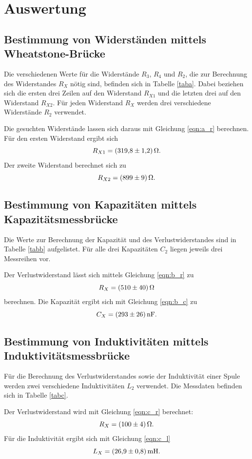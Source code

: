 \section{Auswertung}
\label{sec:Auswertung}

\subsection{Bestimmung von Widerständen mittels Wheatstone-Brücke}
Die verschiedenen Werte für die Widerstände $R_3$, $R_4$ und $R_2$, die zur Berechnung des Widerstandes $R_X$
nötig sind, befinden sich in Tabelle \ref{taba}. Dabei beziehen sich die ersten drei Zeilen auf den Widerstand
$R_{X1}$ und die letzten drei auf den Widerstand $R_{X2}$. Für jeden Widerstand $R_X$ werden drei verschiedene
Widerstände $R_2$ verwendet.

\noindent Die gesuchten Widerstände lassen sich daraus mit Gleichung \eqref{eqn:a_r} berechnen.
Für den ersten Widerstand ergibt sich
\begin{equation*}
    R_{X1} = \SI{319.8 \pm 1.2}{\ohm}.
\end{equation*}
Der zweite Widerstand berechnet sich zu
\begin{equation*}
    R_{X2} = \SI{899 \pm 9}{\ohm}.
\end{equation*}

\subsection{Bestimmung von Kapazitäten mittels Kapazitätsmessbrücke}
Die Werte zur Berechnung der Kapazität und des Verlustwiderstandes sind in Tabelle \ref{tabb} aufgelistet.
Für alle drei Kapazitäten $C_2$ liegen jeweils drei Messreihen vor.

\noindent Der Verlustwiderstand lässt sich mittels Gleichung \eqref{eqn:b_r} zu
\begin{equation*}
    R_X = \SI{510 \pm 40}{\ohm}
\end{equation*}
berechnen.
Die Kapazität ergibt sich mit Gleichung \eqref{eqn:b_c} zu
\begin{equation*}
    C_X = \SI{293 \pm 26}{\nano\farad}.
\end{equation*}

\subsection{Bestimmung von Induktivitäten mittels Induktivitätsmessbrücke}
Für die Berechnung des Verlustwiderstandes sowie der Induktivität einer Spule werden zwei verschiedene
Induktivitäten $L_2$ verwendet. Die Messdaten befinden sich in Tabelle \ref{tabc}.

\noindent Der Verlustwiderstand wird mit Gleichung \eqref{eqn:c_r} berechnet:
\begin{equation*}
    R_X = \SI{100 \pm 4}{\ohm}.
\end{equation*}
Für die Induktivität ergibt sich mit Gleichung \eqref{eqn:c_l}
\begin{equation*}
    L_X = \SI{26.9 \pm 0.8}{\milli\henry}.
\end{equation*}

